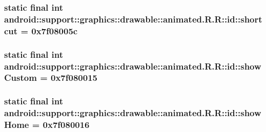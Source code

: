 \hypertarget{classandroid_1_1support_1_1graphics_1_1drawable_1_1animated_1_1_r_1_1id_f76a09b375dbdf9be2a5e6db14c35df7}{
\subsubsection[{shortcut}]{\setlength{\rightskip}{0pt plus 5cm}static final int android::support::graphics::drawable::animated.R.R::id::shortcut = 0x7f08005c}}
\label{classandroid_1_1support_1_1graphics_1_1drawable_1_1animated_1_1_r_1_1id_f76a09b375dbdf9be2a5e6db14c35df7}


\hypertarget{classandroid_1_1support_1_1graphics_1_1drawable_1_1animated_1_1_r_1_1id_279b1c99c9fcd8931b8d2c364fa77551}{
\subsubsection[{showCustom}]{\setlength{\rightskip}{0pt plus 5cm}static final int android::support::graphics::drawable::animated.R.R::id::showCustom = 0x7f080015}}
\label{classandroid_1_1support_1_1graphics_1_1drawable_1_1animated_1_1_r_1_1id_279b1c99c9fcd8931b8d2c364fa77551}


\hypertarget{classandroid_1_1support_1_1graphics_1_1drawable_1_1animated_1_1_r_1_1id_3782596f3e9c0c7dc9721d3fad6e473e}{
\subsubsection[{showHome}]{\setlength{\rightskip}{0pt plus 5cm}static final int android::support::graphics::drawable::animated.R.R::id::showHome = 0x7f080016}}
\label{classandroid_1_1support_1_1graphics_1_1drawable_1_1animated_1_1_r_1_1id_3782596f3e9c0c7dc9721d3fad6e473e}


